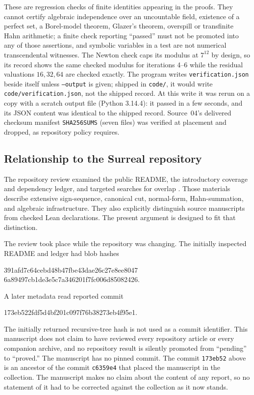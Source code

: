 \documentclass[11pt]{article}
\theoremstyle{definition}
\theoremstyle{remark}
\newcommand{\fn}[1]{\nolinkurl{#1}}
\begin{document}
These are regression checks of finite identities appearing in the proofs.
They cannot certify algebraic independence over an uncountable field,
existence of a perfect set, a Borel-model theorem, Glazer's theorem,
overspill or transfinite Hahn arithmetic; a finite check reporting
``passed'' must not be promoted into any of those assertions, and symbolic
variables in a test are not numerical transcendental witnesses. The Newton
check caps its modulus at $7^{12}$ by design, so its record shows the same
checked modulus for iterations 4--6 while the residual valuations
$16,32,64$ are checked exactly. The program writes \fn{verification.json}
beside itself unless \texttt{--output} is given; shipped in \fn{code/}, it
would write \fn{code/verification.json}, not the shipped record. At this
write it was rerun on a copy with a scratch output file (Python 3.14.4): it
passed in a few seconds, and its JSON content was identical to the shipped
record. Source~04's delivered checksum manifest \fn{SHA256SUMS} (seven
files) was verified at placement and dropped, as repository policy
requires.

\subsection{Relationship to the Surreal repository}
The repository review examined the public README, the introductory
coverage and dependency ledger, and targeted searches for overlap
\cite{Repo}. Those materials describe extensive sign-sequence, canonical
cut, normal-form, Hahn-summation, and algebraic infrastructure. They also
explicitly distinguish source manuscripts from checked Lean declarations.
The present argument is designed to fit that distinction.

The review took place while the repository was changing. The initially
inspected README and ledger had blob hashes
\begin{center}\small\ttfamily
391afd7c64cebd48b47fbe43dae26c27e8ee8047\\
6a89497cb1de3e5c7a346201f7fc006d85082426.
\end{center}
A later metadata read reported commit
\begin{center}\small\ttfamily
173eb522fdf5d4bf201c097f76b38273eb4f95e1.
\end{center}
The initially returned recursive-tree hash is not used as a commit
identifier. This manuscript does not claim to have reviewed every
repository article or every companion archive, and no repository result
is silently promoted from ``pending'' to ``proved.''
The manuscript has no pinned commit. The commit \texttt{173eb52} above
is an ancestor of the commit \texttt{c6359e4} that placed the manuscript
in the collection. The manuscript makes no claim about the content of
any report, so no statement of it had to be corrected against the
collection as it now stands.
\end{document}
